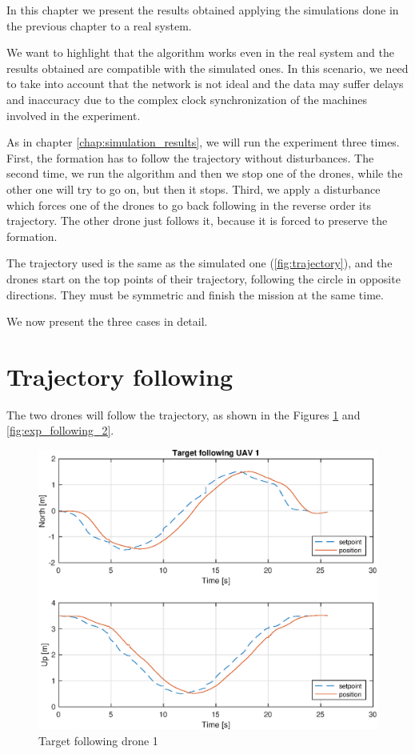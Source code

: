 In this chapter we present the results obtained applying the simulations done in the
previous chapter to a real system.

We want to highlight that the algorithm works even in the real system
and the results obtained are compatible with the simulated ones.
In this scenario, we need to take into account that the network is not ideal and
the data may suffer delays and inaccuracy due to the complex clock synchronization
of the machines involved in the experiment.

As in chapter \ref{chap:simulation_results}, we will run the experiment three times.
First, the formation has to follow the trajectory without disturbances.
The second time, we run the algorithm and then we stop one of the drones, while the other one
will try to go on, but then it stops.
Third, we apply a disturbance which forces one of the drones to go back following
in the reverse order its trajectory. The other drone just follows it, because it is
forced to preserve the formation.

The trajectory used is the same as the simulated one (\ref{fig:trajectory}), and
the drones start on the top points of their trajectory, following the circle in opposite
directions.
They must be symmetric and finish the mission at the same time.

We now present the three cases in detail.

\section{Trajectory following}
The two drones will follow the trajectory, as shown in the Figures \ref{fig:exp_following_1}
and \ref{fig:exp_following_2}.

\begin{figure}
\centering
\includegraphics[width=0.7\linewidth]{chapters/chapter-05/figures/following_1.eps}
\caption{Target following drone 1}
\label{fig:exp_following_1}
\end{figure}

